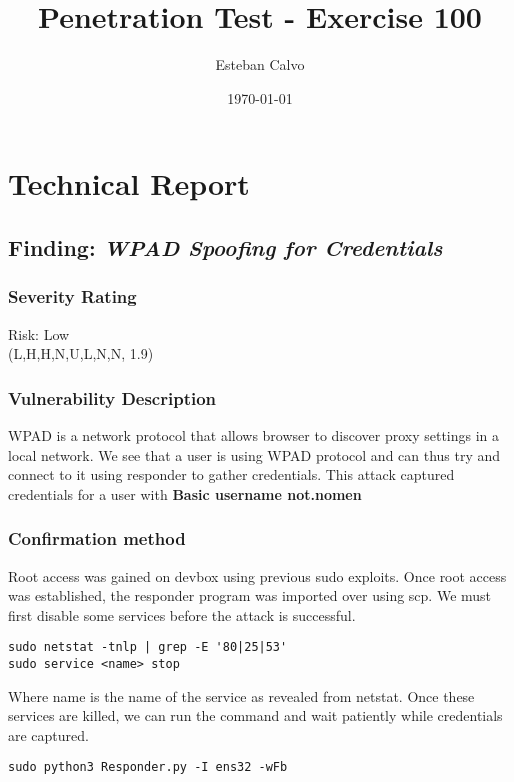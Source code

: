 \documentclass[notitlepage]{article}
\begin{document}
  
\title{Penetration Test - Exercise 100}
\author{Esteban Calvo}
\date{\isodate\today}

\maketitle

\tableofcontents

\newpage

\section{Technical Report}

  \subsection{Finding: \emph{WPAD Spoofing for Credentials}}
  
	\subsubsection*{Severity Rating}
        Risk: Low \\
		\cvss(L,H,H,N,U,L,N,N, 1.9)
		
  	\subsubsection*{Vulnerability Description}
  		WPAD is a network protocol that allows browser to discover proxy settings in a local network. We see that a user is using WPAD protocol	and can thus 
        try and connect to it using responder to gather credentials. This attack captured credentials for a user with \textbf{Basic username {\:} not.nomen}
  	\subsubsection*{Confirmation method}
  	    Root access was gained on devbox using previous sudo exploits. Once root access was established, the responder program was imported over using scp.
        We must first disable some services before the attack is successful.
\begin{verbatim}
sudo netstat -tnlp | grep -E '80|25|53'
sudo service <name> stop
\end{verbatim}
    Where name is the name of the service as revealed from netstat. Once these services are killed, we can run the command and wait patiently while credentials are captured.
\begin{verbatim}
sudo python3 Responder.py -I ens32 -wFb
\end{verbatim}
				
\end{document}
